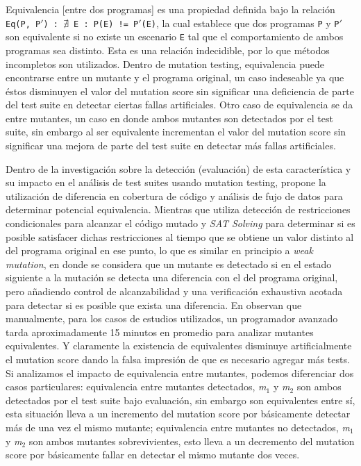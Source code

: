 Equivalencia [entre dos programas] es una propiedad definida bajo la relaci\'on \texttt{Eq(P, P$\prime$) : $\nexists$ E : P(E) != P$\prime$(E)}, la cual establece que dos programas \texttt{P} y \texttt{P$\prime$} son equivalente si no existe un escenario \texttt{E} tal que el comportamiento de ambos programas sea distinto. Esta es una relaci\'on indecidible, por lo que m\'etodos incompletos son utilizados. Dentro de mutation testing, equivalencia puede encontrarse entre un mutante y el programa original, un caso indeseable ya que \'estos disminuyen el valor del mutation score sin significar una deficiencia de parte del test suite en detectar ciertas fallas artificiales. Otro caso de equivalencia se da entre mutantes, un caso en donde ambos mutantes son detectados por el test suite, sin embargo al ser equivalente incrementan el valor del mutation score sin significar una mejora de parte del test suite en detectar m\'as fallas artificiales.

Dentro de la investigaci\'on sobre la detecci\'on (evaluaci\'on) de esta caracter\'istica y su impacto en el an\'alisis de test suites usando mutation testing, \cite{biblography.mutation.evaluation.equivalent.Schuler+10} propone la utilizaci\'on de diferencia en cobertura de c\'odigo y an\'alisis de fujo de datos para determinar potencial equivalencia. Mientras que  \cite{biblography.mutation.evaluation.equivalent.Just+13} utiliza detecci\'on de restricciones condicionales para alcanzar el c\'odigo mutado y \emph{SAT Solving} para determinar si es posible satisfacer dichas restricciones al tiempo que se obtiene un valor distinto al del programa original en ese punto, lo que es similar en principio a \emph{weak mutation}, en donde se considera que un mutante es detectado si en el estado siguiente a la mutaci\'on se detecta una diferencia con el del programa original, pero a\~nadiendo control de alcanzabilidad y una verificaci\'on exhaustiva acotada para detectar si es posible que exista una diferencia.
En \cite{biblography.mutation.evaluation.equivalent.Grun+09} observan que manualmente, para los casos de estudios utilizados, un programador avanzado tarda aproximadamente 15 minutos en promedio para analizar mutantes equivalentes. Y claramente la existencia de equivalentes disminuye artificialmente el mutation score dando la falsa impresi\'on de que es necesario agregar m\'as tests. Si analizamos el impacto de equivalencia entre mutantes, podemos diferenciar dos casos particulares: equivalencia entre mutantes detectados, \emph{m$_1$} y \emph{m$_2$} son ambos detectados por el test suite bajo evaluaci\'on, sin embargo son equivalentes entre s\'i, esta situaci\'on lleva a un incremento del mutation score por b\'asicamente detectar m\'as de una vez el mismo mutante; equivalencia entre mutantes no detectados, \emph{m$_1$} y \emph{m$_2$} son ambos mutantes sobrevivientes, esto lleva a un decremento del mutation score por b\'asicamente fallar en detectar el mismo mutante dos veces.

